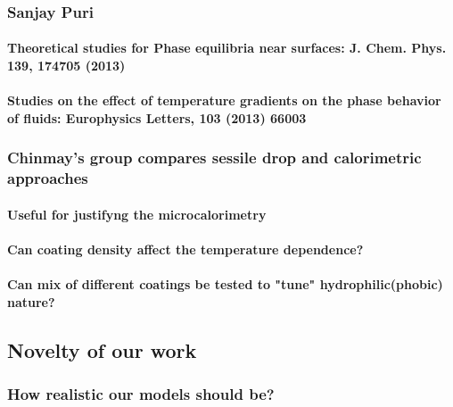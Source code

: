 \documentclass[a4paper,12pt,single,pdftex]{scrartcl}
\begin{document}
{\label{ID_154250283}\subsubsection{Sanjay Puri}

\label{ID_920584188}\paragraph{Theoretical studies for Phase equilibria near surfaces: J. Chem. Phys. 139, 174705 (2013)}

\label{ID_595749615}\paragraph{Studies on the effect of temperature gradients on the phase behavior of fluids: Europhysics Letters, 103 (2013) 66003}

\label{ID_135785427}\subsubsection{Chinmay's group compares sessile drop and calorimetric approaches}

\label{ID_1532965186}\paragraph{Useful for justifyng the microcalorimetry}

\label{ID_838488932}\paragraph{Can coating density affect the temperature dependence?}

\label{ID_1401479645}\paragraph{Can mix of different coatings be tested to "tune" hydrophilic(phobic) nature?}

\label{ID_1979164963}\subsection{Novelty of our work}

\label{ID_1997632539}\subsubsection{How realistic our models should be?}

}
\end{document}
